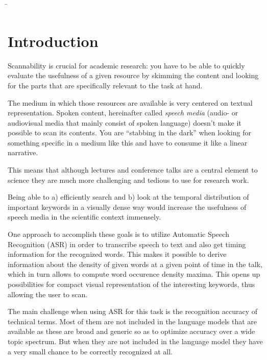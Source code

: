\documentclass[]{article}
\begin{document}
\begin{titlepage}
\begin{tabbing}
	\hspace{20em} \=  \kill

	\end{tabbing}

\end{titlepage}

{
\hypersetup{linkcolor=black}
\setcounter{tocdepth}{3}
\tableofcontents
}
\newpage

\section{Introduction}\label{introduction}

Scannability is crucial for academic research: you have to be able to
quickly evaluate the usefulness of a given resource by skimming the
content and looking for the parts that are specifically relevant to the
task at hand.

The medium in which those resources are available is very centered on
textual representation. Spoken content, hereinafter called \emph{speech
media} (audio- or audiovisual media that mainly consist of spoken
language) doesn't make it possible to scan its contents. You are
``stabbing in the dark'' when looking for something specific in a medium
like this and have to consume it like a linear narrative.

This means that although lectures and conference talks are a central
element to science they are much more challenging and tedious to use for
research work.

Being able to a) efficiently search and b) look at the temporal
distribution of important keywords in a visually dense way would
increase the usefulness of speech media in the scientific context
immensely.

One approach to accomplish these goals is to utilize Automatic Speech
Recognition (ASR) in order to transcribe speech to text and also get
timing information for the recognized words. This makes it possible to
derive information about the density of given words at a given point of
time in the talk, which in turn allows to compute word occurence density
maxima. This opens up possibilities for compact visual representation of
the interesting keywords, thus allowing the user to scan.

The main challenge when using ASR for this task is the recognition
accuracy of technical terms. Most of them are not included in the
language models that are available as these are broad and generic so as
to optimize accuracy over a wide topic spectrum. But when they are not
included in the language model they have a very small chance to be
correctly recognized at all.
\end{document}
